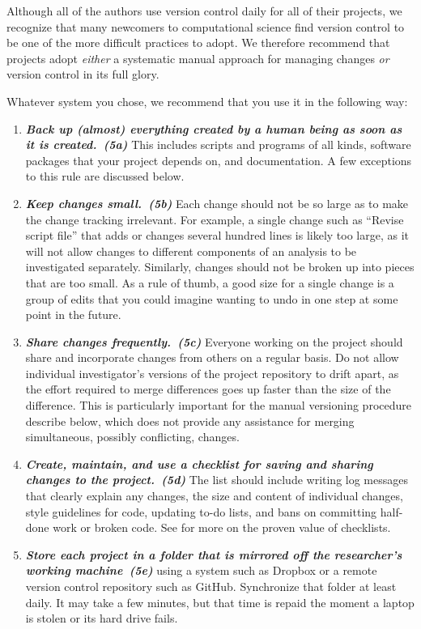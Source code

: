 \documentclass[10pt,letterpaper]{article}
\newcommand{\practice}[2]{\textbf{\emph{{#2}~({#1})}}}
\begin{document}
Although all of the authors use version control daily for all of their
projects, we recognize that many newcomers to computational science
find version control to be one of the more difficult practices to
adopt.  We therefore recommend that projects adopt \emph{either} a
systematic manual approach for managing changes \emph{or} version
control in its full glory.

Whatever system you chose, we recommend that you use it in the following way:

\begin{enumerate}

\item
  \practice{5a}{Back up (almost) everything created by a human being as
    soon as it is created.} This includes scripts and programs of all
  kinds, software packages that your project depends on, and
  documentation. A few exceptions to this rule are discussed below.

\item
  \practice{5b}{Keep changes small.}  Each change should not be so large
  as to make the change tracking irrelevant. For example, a single
  change such as ``Revise script file'' that adds or changes several
  hundred lines is likely too large, as it will not allow changes to
  different components of an analysis to be investigated
  separately. Similarly, changes should not be broken up into pieces
  that are too small. As a rule of thumb, a good size for a single change is
  a group of edits that you could imagine wanting to undo in one step
  at some point in the future.

\item
  \practice{5c}{Share changes frequently.} Everyone working on the
  project should share and incorporate changes from others on a
  regular basis. Do not allow individual investigator's versions of
  the project repository to drift apart, as the effort required to
  merge differences goes up faster than the size of the
  difference. This is particularly important for the manual versioning
  procedure describe below, which does not provide any
  assistance for merging simultaneous, possibly conflicting, changes.

\item
  \practice{5d}{Create, maintain, and use a checklist for saving and
    sharing changes to the project.} The list should include writing
  log messages that clearly explain any changes, the size and content
  of individual changes, style guidelines for code, updating to-do
  lists, and bans on committing half-done work or broken code.  See
  \cite{gawande2011} for more on the proven value of checklists.

\item
  \practice{5e}{Store each project in a folder that is mirrored off the
    researcher's working machine} using a system such as Dropbox
    or a remote version control repository such as GitHub.
    Synchronize that folder at least daily. It may take a few minutes,
  but that time is repaid the
  moment a laptop is stolen or its hard drive fails.

\end{enumerate}
\end{document}
